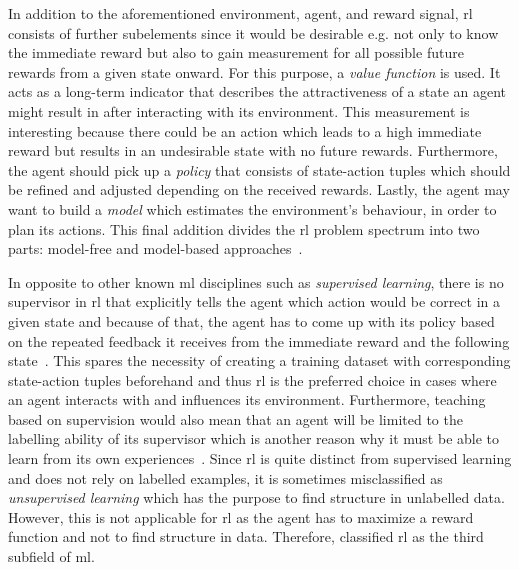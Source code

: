 \documentclass[draft,final]{vutinfth} %
\newcommand{\p}[1]{see p. #1}
\begin{document}
    In addition to the aforementioned environment, agent, and reward signal, \gls{rl} consists of further subelements since it would be desirable e.g. not only to know the immediate reward but also to gain measurement for all possible future rewards from a given state onward.
    For this purpose, a \textit{value function} is used.
    It acts as a long-term indicator that describes the attractiveness of a state an agent might result in after interacting with its environment.
    This measurement is interesting because there could be an action which leads to a high immediate reward but results in an undesirable state with no future rewards.
    Furthermore, the agent should pick up a \textit{policy} that consists of state-action tuples which should be refined and adjusted depending on the received rewards.
    Lastly, the agent may want to build a \textit{model} which estimates the environment's behaviour, in order to plan its actions.
    This final addition divides the \gls{rl} problem spectrum into two parts: model-free and model-based approaches~\citep[6f]{sutton_reinforcement_2018}.


    In opposite to other known \gls{ml} disciplines such as \textit{supervised learning}, there is no supervisor in \gls{rl} that explicitly tells the agent which action would be correct in a given state and because of that, the agent has to come up with its policy based on the repeated feedback it receives from the immediate reward and the following state~\citep{kaelbling_reinforcement_1996}.
    This spares the necessity of creating a training dataset with corresponding state-action tuples beforehand and thus \gls{rl} is the preferred choice in cases where an agent interacts with and influences its environment.
    Furthermore, teaching based on supervision would also mean that an agent will be limited to the labelling ability of its supervisor which is another reason why it must be able to learn from its own experiences~.
    Since \gls{rl} is quite distinct from supervised learning and does not rely on labelled examples, it is sometimes misclassified as \textit{unsupervised learning} which has the purpose to find structure in unlabelled data.
    However, this is not applicable for \gls{rl} as the agent has to maximize a reward function and not to find structure in data.
    Therefore, \citet[\p{2}]{sutton_reinforcement_2018} classified \gls{rl} as the third subfield of \gls{ml}.
\end{document}
